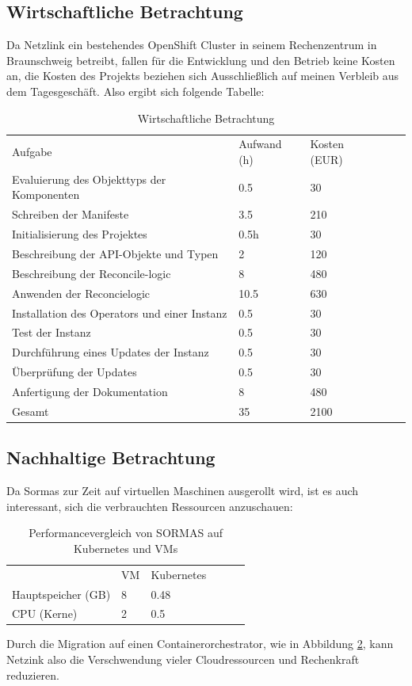 \documentclass[a4paper,11pt]{article}
\begin{document}
    \subsection{Wirtschaftliche Betrachtung}
    Da Netzlink ein bestehendes OpenShift Cluster in seinem Rechenzentrum in Braunschweig betreibt, fallen für die Entwicklung und den Betrieb keine Kosten an,
    die Kosten des Projekts beziehen sich Ausschließlich auf meinen Verbleib aus dem Tagesgeschäft. Also ergibt sich folgende Tabelle:
    \begin{table}[!ht]
        \centering
        \caption{Wirtschaftliche Betrachtung}
        \label{tab:wirt-betr}
        \begin{tabular}{lllll}
         Aufgabe &  Aufwand (h) & Kosten (EUR)  \\
         Evaluierung des Objekttyps der Komponenten & 0.5 & 30  \\
         Schreiben der Manifeste & 3.5 & 210 \\
         Initialisierung des Projektes & 0.5h & 30 \\
         Beschreibung der API-Objekte und Typen & 2 & 120 \\
         Beschreibung der Reconcile-logic & 8 &  480 \\
         Anwenden der Reconcielogic & 10.5 & 630 \\
         Installation des Operators und einer Instanz & 0.5 & 30 \\
         Test der Instanz & 0.5 & 30 \\
         Durchführung eines Updates der Instanz & 0.5 & 30 \\
         Überprüfung der Updates & 0.5 & 30 \\
         Anfertigung der Dokumentation & 8 & 480 \\
         Gesamt & 35  & 2100 \\
        \end{tabular}
    \end{table}
    \subsection{Nachhaltige Betrachtung} 
    Da Sormas zur Zeit auf virtuellen Maschinen ausgerollt wird, ist es auch interessant,
    sich die verbrauchten Ressourcen anzuschauen:
    \begin{table}
        \caption{Performancevergleich von SORMAS auf Kubernetes und VMs}
        \label{tab:perf_k8s_vm}
        \begin{tabular}{llllll}
           & VM & Kubernetes \\
           Hauptspeicher (GB) & 8 & 0.48 \\
           CPU (Kerne) & 2 & 0.5 \\
        \end{tabular}
    \end{table}
    Durch die Migration auf einen Containerorchestrator, wie in Abbildung \ref{tab:perf_k8s_vm}, kann Netzink also 
    die Verschwendung vieler Cloudressourcen und Rechenkraft reduzieren.
\end{document}
